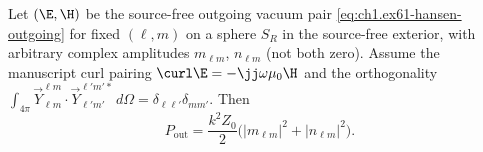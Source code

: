 \begin{proposition}
\label{prop:ch1.single-hansen-power}
Let $(\E,\H)$ be the source-free outgoing vacuum pair \eqref{eq:ch1.ex61-hansen-outgoing} for fixed $(\ell,m)$ on a sphere $S_R$ in the source-free exterior, with arbitrary complex amplitudes $m_{\ell m}$, $n_{\ell m}$ (not both zero). Assume the manuscript curl pairing $\curl\E=-\jj\omega\mu_0\H$ and the orthogonality $\int_{4\pi}\vec Y_{\ell m}^{\ell m}\cdot\vec Y_{\ell'm'}^{\ell'm'*}\,d\Omega=\delta_{\ell\ell'}\delta_{mm'}$. Then
\begin{equation}
\label{eq:ch1.ex61-single-mode-power}
P_{\mathrm{out}}=\frac{k^2 Z_0}{2}\bigl(|m_{\ell m}|^2+|n_{\ell m}|^2\bigr).
\end{equation}
\end{proposition}
